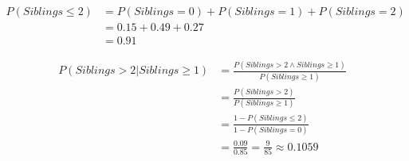 \documentclass[11pt, a4paper, english]{../Template/NTNUoving}
\begin{document}
\begin{oppgave}

    \begin{punkt}
        \begin{align*}
            P(Siblings \leq 2)
            &= P(Siblings = 0) + P(Siblings = 1) + P(Siblings = 2) \\
            &= 0.15 + 0.49 + 0.27 \\
            &= 0.91
        \end{align*}
    \end{punkt}

    \begin{punkt}
        \begin{align*}
            P(Siblings > 2 | Siblings \geq 1)
            &= \frac{P(Siblings > 2 \wedge Siblings \geq 1)}{P(Siblings \geq 1)} \\
            &= \frac{P(Siblings > 2)}{P(Siblings \geq 1)} \\
            &= \frac{1-P(Siblings \leq 2)}{1-P(Siblings = 0)} \\
            &= \frac{0.09}{0.85} = \frac{9}{85} \approx 0.1059
        \end{align*}
    \end{punkt}

    \begin{punkt}

    \end{punkt}

    \begin{punkt}
    \end{punkt}
\end{oppgave}

\begin{oppgave}
    \begin{punkt}
    \end{punkt}
\end{oppgave}

\begin{oppgave}
    \begin{punkt}
    \end{punkt}
\end{oppgave}

\begin{oppgave}
    \begin{punkt}
    \end{punkt}
\end{oppgave}
\end{document}
